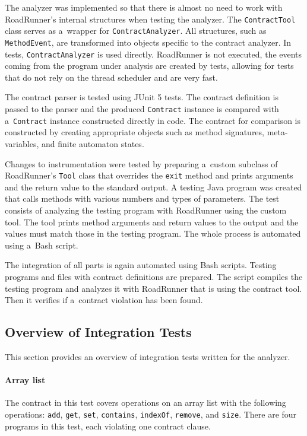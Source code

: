 The analyzer was implemented so that there is almost no need to work with
RoadRunner's internal structures when testing the analyzer. The
\texttt{ContractTool} class serves as a~wrapper for \texttt{ContractAnalyzer}.
All structures, such as \texttt{MethodEvent}, are transformed into objects
specific to the contract analyzer. In tests, \texttt{ContractAnalyzer} is used
directly. RoadRunner is not executed, the events coming from the program under
analysis are created by tests, allowing for tests that do not rely on the
thread scheduler and are very fast.

The contract parser is tested using JUnit 5 tests. The contract definition is
passed to the parser and the produced \texttt{Contract} instance is compared
with a~\texttt{Contract} instance constructed directly in code. The contract for
comparison is constructed by creating appropriate objects such as method
signatures, meta-variables, and finite automaton states.

Changes to instrumentation were tested by preparing a~custom subclass of
RoadRunner's \texttt{Tool} class that overrides the \texttt{exit} method and
prints arguments and the return value to the standard output. A testing Java
program was created that calls methods with various numbers and types of
parameters. The test consists of analyzing the testing program with RoadRunner
using the custom tool. The tool prints method arguments and return values to the
output and the values must match those in the testing program. The whole process
is automated using a~Bash script.

The integration of all parts is again automated using Bash scripts. Testing
programs and files with contract definitions are prepared. The script compiles
the testing program and analyzes it with RoadRunner that is using the contract
tool. Then it verifies if a~contract violation has been found.

\subsection{Overview of Integration Tests}
This section provides an overview of integration tests written for the analyzer.

\paragraph{Array list}
The contract in this test covers operations on an array list with the following
operations: \texttt{add}, \texttt{get}, \texttt{set}, \texttt{contains},
\texttt{indexOf}, \texttt{remove}, and \texttt{size}. There are four programs in
this test, each violating one contract clause.

